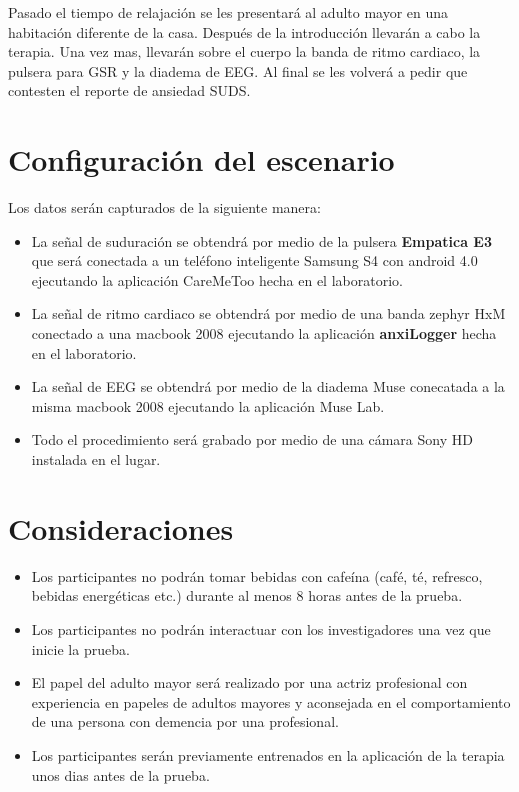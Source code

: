 	Pasado el tiempo de relajaci\'on se les presentar\'a al adulto mayor en una habitaci\'on diferente de la casa. Despu\'es de la introducci\'on
	llevar\'an a cabo la terapia. Una vez mas, llevar\'an sobre el cuerpo la banda de ritmo cardiaco, la pulsera para GSR y la diadema de EEG. Al final se les volver\'a a pedir que contesten el reporte de ansiedad SUDS.

\section{Configuraci\'on del escenario}
	
	Los datos ser\'an capturados de la siguiente manera:
	\begin{itemize}
		\item{La se\~nal de suduraci\'on se obtendr\'a por medio de la pulsera \textbf{Empatica E3} que ser\'a conectada a un tel\'efono inteligente Samsung S4 con android 4.0 ejecutando la aplicaci\'on CareMeToo hecha en el laboratorio.}
		\item{La se\~nal de ritmo cardiaco se obtendr\'a por medio de una banda zephyr HxM conectado a una macbook 2008 ejecutando la aplicaci\'on \textbf{anxiLogger} hecha en el laboratorio.}
		\item{La se\~nal de EEG se obtendr\'a por medio de la diadema Muse conecatada a la misma macbook 2008 ejecutando la aplicaci\'on Muse Lab.}
		\item{Todo el procedimiento ser\'a grabado por medio de una c\'amara Sony HD instalada en el lugar.}
	\end{itemize}
\section{Consideraciones}
	\begin{itemize}
		\item{Los participantes no podr\'an tomar bebidas con cafe\'ina (caf\'e, t\'e, refresco, bebidas energ\'eticas etc.) durante al menos 8 horas antes de la prueba.}
		\item{Los participantes no podr\'an interactuar con los investigadores una vez que inicie la prueba.}
		\item{El papel del adulto mayor ser\'a realizado por una actriz profesional con experiencia en papeles de adultos mayores y aconsejada en el comportamiento de una persona con demencia por una profesional.}
		\item{Los participantes ser\'an previamente entrenados en la aplicaci\'on de la terapia unos dias antes de la prueba.}
	\end{itemize}
